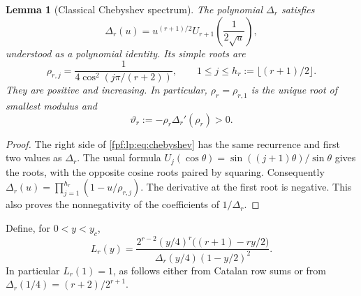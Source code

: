 \documentclass[11pt]{article}
\numberwithin{equation}{section}
\newtheorem{lemma}[theorem]{Lemma}
\theoremstyle{definition}
\begin{document}
\begin{lemma}[Classical Chebyshev spectrum]\label{fpf:lp:lem:spectrum}
The polynomial \(\Delta_r\) satisfies
\begin{equation}\label{fpf:lp:eq:chebyshev}
 \Delta_r(u)=u^{(r+1)/2}U_{r+1}\!\left(\frac1{2\sqrt u}\right),
\end{equation}
understood as a polynomial identity. Its simple roots are
\[
 \rho_{r,j}=\frac1{4\cos^2(j\pi/(r+2))},\qquad
 1\le j\le h_r:=\lfloor(r+1)/2\rfloor.
\]
They are positive and increasing. In particular, \(\rho_r=\rho_{r,1}\)
is the unique root of smallest modulus and
\begin{equation}\label{fpf:lp:eq:d-r}
 \vartheta_r:=-\rho_r\Delta_r'(\rho_r)>0.
\end{equation}
\end{lemma}
\begin{proof}
The right side of \eqref{fpf:lp:eq:chebyshev} has the same recurrence and
first two values as \(\Delta_r\). The usual formula
\(U_j(\cos\theta)=\sin((j+1)\theta)/\sin\theta\) gives the roots,
with the opposite cosine roots paired by squaring. Consequently
\(\Delta_r(u)=\prod_{j=1}^{h_r}(1-u/\rho_{r,j})\).
The derivative at the first root is negative. This also proves the
nonnegativity of the coefficients of \(1/\Delta_r\).
\end{proof}

Define, for \(0<y<y_c\),
\begin{equation}\label{fpf:lp:eq:L}
 L_r(y)=
 \frac{2^{r-2}(y/4)^r\bigl((r+1)-ry/2\bigr)}
 {\Delta_r(y/4)(1-y/2)^2}.
\end{equation}
In particular \(L_r(1)=1\), as follows either from Catalan row sums or
from \(\Delta_r(1/4)=(r+2)/2^{r+1}\).
\end{document}
